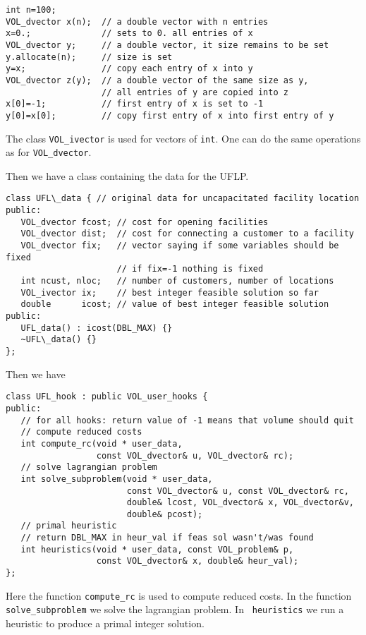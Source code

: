 \documentclass{article}
\begin{document}
\begin{verbatim}
int n=100; 
VOL_dvector x(n);  // a double vector with n entries 
x=0.;              // sets to 0. all entries of x 
VOL_dvector y;     // a double vector, it size remains to be set 
y.allocate(n);     // size is set
y=x;               // copy each entry of x into y 
VOL_dvector z(y);  // a double vector of the same size as y, 
                   // all entries of y are copied into z 
x[0]=-1;           // first entry of x is set to -1 
y[0]=x[0];         // copy first entry of x into first entry of y
\end{verbatim}

The class {\tt VOL\_ivector} is used for vectors of {\tt int}. One can do the
same operations as for {\tt VOL\_dvector}.

Then we have a class containing the data for the UFLP.

\begin{verbatim}
class UFL\_data { // original data for uncapacitated facility location
public:
   VOL_dvector fcost; // cost for opening facilities
   VOL_dvector dist;  // cost for connecting a customer to a facility
   VOL_dvector fix;   // vector saying if some variables should be fixed
                      // if fix=-1 nothing is fixed
   int ncust, nloc;   // number of customers, number of locations
   VOL_ivector ix;    // best integer feasible solution so far
   double      icost; // value of best integer feasible solution 
public:
   UFL_data() : icost(DBL_MAX) {}
   ~UFL\_data() {}  
};
\end{verbatim}

Then we have

\begin{verbatim}
class UFL_hook : public VOL_user_hooks {
public:
   // for all hooks: return value of -1 means that volume should quit
   // compute reduced costs
   int compute_rc(void * user_data, 
                  const VOL_dvector& u, VOL_dvector& rc);
   // solve lagrangian problem
   int solve_subproblem(void * user_data, 
                        const VOL_dvector& u, const VOL_dvector& rc,
                        double& lcost, VOL_dvector& x, VOL_dvector&v,
                        double& pcost);
   // primal heuristic
   // return DBL_MAX in heur_val if feas sol wasn't/was found 
   int heuristics(void * user_data, const VOL_problem& p, 
                  const VOL_dvector& x, double& heur_val);
};
\end{verbatim}

Here the function {\tt compute\_rc} is used to compute reduced costs. In the
function {\tt solve\_subproblem} we solve the lagrangian problem. In {\tt
heuristics} we run a heuristic to produce a primal integer solution.
\end{document}
